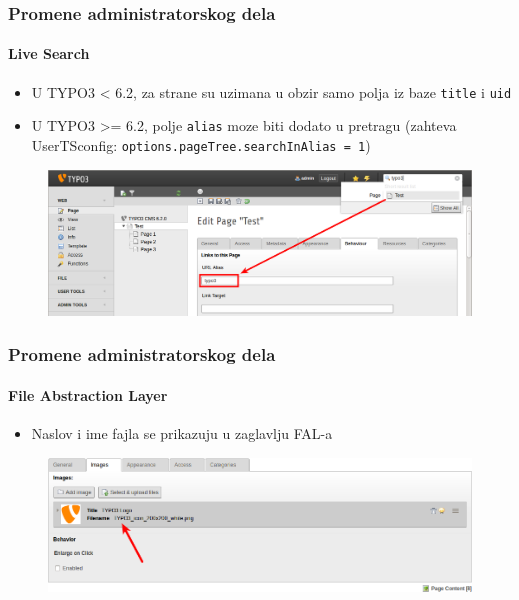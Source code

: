 
\begin{frame}[fragile]
	\frametitle{Promene administratorskog dela}
	\framesubtitle{Live Search}

	\begin{itemize}
		\item U TYPO3 < 6.2, za strane su uzimana u obzir samo polja iz baze \texttt{title} i \texttt{uid} 
		\item U TYPO3 >= 6.2, polje \texttt{alias} moze biti dodato u pretragu\newline
			(zahteva UserTSconfig: \texttt{options.pageTree.searchInAlias = 1})
	\end{itemize}

	\begin{figure}
		\includegraphics[width=0.95\linewidth]{Images/BackendChanges/LiveSearchInAlias.png}
	\end{figure}

\end{frame}


\begin{frame}[fragile]
	\frametitle{Promene administratorskog dela}
	\framesubtitle{File Abstraction Layer}

	\begin{itemize}
		\item Naslov i ime fajla se prikazuju u zaglavlju FAL-a
	\end{itemize}

	\begin{figure}
		\includegraphics[width=0.95\linewidth]{Images/BackendChanges/FalTitleAndFilename.png}
	\end{figure}

\end{frame}

